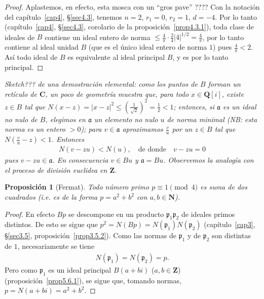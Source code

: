 \documentclass[oneside,bibtotoc,leqno,spanish]{amsbook}
\newcommand{\QQ}{\mathbf{Q}}
\newcommand{\ZZ}{\mathbf{Z}}
\newcommand{\NN}{\mathbf{N}}
\newcommand{\CC}{\mathbf{C}}
\newcommand{\idl}[1]{\mathfrak{#1}}
\newcommand{\QED}{}%
\newcommand{\abs}[1]{\left\lvert#1\right\rvert}
\numberwithin{equation}{section}
\newenvironment{comm}%
	{\begin{trivlist}\item\small\itshape}
	{\end{trivlist}}
\theoremstyle{defi}
\theoremstyle{note}
\newtheorem{proposition}{Proposici\'on}
\theoremstyle{rem}
\numberwithin{theorem}{section}
\numberwithin{proposition}{section}
\numberwithin{definition}{section}
\numberwithin{lemma}{section}
\numberwithin{corollary}{section}
\numberwithin{example}{section}
\numberwithin{footnote}{section}%
\begin{document}
\begin{proof}
Aplastemos, en efecto, esta mosca con un ``gros pave'' ???? Con la notaci\'on del cap\'itulo~\ref{cap4},
\S\ref{sec4.3}, tenemos $n=2$, $r_{1}=0$, $r_{2}=1$, $d=-4$. Por lo tanto (cap\'itulo~\ref{cap4}, \S\ref{sec4.3},
corolario de la proposici\'on~\ref{prop4.3.1}),
toda clase de ideales de $B$ contiene un ideal entero de norma $\leq\frac{4}{\pi}\cdot\frac{2}{4}
\abs{4}^{1/2}=\frac{4}{\pi}$, por lo tanto contiene al ideal unidad $B$ (que es el \'unico ideal entero de
norma $1$) pues $\frac{4}{\pi}<2$. As\'i todo ideal de $B$ es equivalente al ideal principal $B$, y es por
lo tanto principal. \QED
\end{proof}

\begin{comm}
{\em Sketch???} de una demostraci\'on elemental: como los puntos de $B$ forman un ret\'iculo de $\CC$,
un poco de geometr\'ia muestra que, para todo $x\in\QQ[i]$, existe $z\in B$ tal que
$N(x-z)=\abs{x-z}^{2}\leq\left(\frac{1}{\sqrt{2}}\right)^{2}=\frac{1}{2}< 1$; entonces, si $\idl{a}$ es un
ideal no nulo de $B$, elegimos en $\idl{a}$ un elemento no nulo $u$ de norma minimal (NB: esta norma es un
entero $>0$); para $v\in\idl{a}$ aproximamos $\frac{v}{u}$ por un $z\in B$ tal que $N\left(\frac{v}{u}-z\right)<1$.
Entonces
\begin{gather*}
N(v-zu) < N(u),\quad\text{de donde}\quad v-zu=0
\end{gather*}
pues $v-zu\in\idl{a}$. En consecuencia $v\in Bu$ y $\idl{a}=Bu$. Observemos la analog\'ia con el proceso de
divisi\'on euclidea en $\ZZ$.
\end{comm}

\begin{proposition}[Fermat]\label{prop5.6.2}
Todo n\'umero primo $p\equiv 1\pmod 4$ es suma de dos cuadrados (i.e. es de la forma $p=a^{2}+b^{2}$ con
$a,b\in\NN$).
\end{proposition}

\begin{proof}
En efecto $Bp$ se descompone en un producto $\idl{p}_{1}\idl{p}_{2}$ de ideales primos distintos.
De esto se sigue que $p^{2}=N(Bp) = N(\idl{p}_{1})N(\idl{p}_{2})$ (cap\'itulo~\ref{cap3}, \S\ref{sec3.5},
proposici\'on~\ref{prop3.5.2}).
Como las normas de $\idl{p}_{1}$ y de $\idl{p}_{2}$ son distintas de $1$, necesariamente se tiene
\begin{gather*}
N(\idl{p}_{1}) = N(\idl{p}_{2}) = p.
\end{gather*}
Pero como $\idl{p}_{1}$ es un ideal principal $B(a+bi)$ ($a,b\in\ZZ$)
(proposici\'on~\ref{prop5.6.1}), se sigue que, tomando
normas, $p = N(a+bi)=a^{2}+b^{2}$. \QED
\end{proof}
\end{document}
